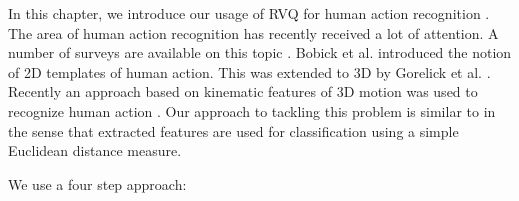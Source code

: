 \documentclass[12pt,letterpaper,doublespaced,ETD]{gt-ece-thesis} %
\begin{document}
\begin{Body}
In this chapter, we introduce our usage of RVQ for human action recognition \cite{2010_CNF_HMMRVQ_Aslam}.  The area of human action recognition has recently received a lot of attention.  A number of surveys are available on this topic \cite{1995_JNL_SURVEYmotion_Cedras, 1999_JNL_SURVEYmotion_Aggarwal, 1999_JNL_SURVEYmotion_Gavrila, 1999_REP_SURVEYmotion_Moeslund, 2001_JNL_SURVEYmotion_Moeslund, 2003_JNL_SURVEYiu_Buxton, 2003_JNL_SURVEYmotion_LWang, 2003_JNL_SURVEYbeh_Shah,2003_JNL_SURVEYaction_JWang, 2004_CNF_SURVEYaction_Aggarwal, 2004_JNL_SURVEYiu_Hu, 2004_CNF_SURVEYgait_Nixon, 2004_CNF_Survey3DshapeRetrieval, 2006_JNL_HumanMotion_Moeslund, 2007_JNL_HumanMotion_Poppe, 2008_CNF_SurveyHumanActivityRecognition_Ahad, 2010_JNL_SURVEYmotion_Ji}.  Bobick et al. \cite{2001_JNL_MotionTemplates_Bobick} introduced the notion of 2D templates of human action.  This was extended to 3D by Gorelick et al. \cite{2007_JNL_SpaceTimeShapes_Gorelick}.  Recently an approach based on kinematic features of 3D motion was used to recognize human action \cite{2010_JNL_ActionReconKinematic_Ali}.  Our approach to tackling this problem is similar to \cite{2007_JNL_SpaceTimeShapes_Gorelick} in the sense that extracted features are used for classification using a simple Euclidean distance measure.  

We use a four step approach:  

			\begin{figure}%
						

\end{figure}
\end{Body}
\end{document}
